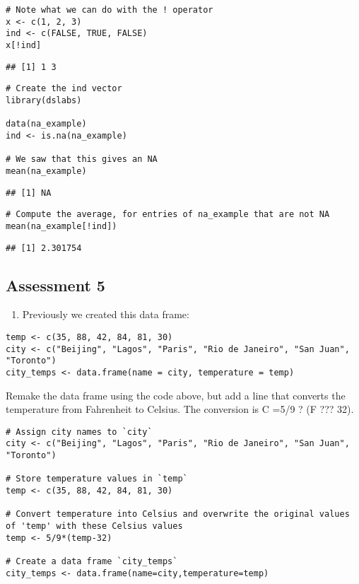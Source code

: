 \documentclass[
]{article}
\providecommand{\tightlist}{%
  \setlength{\itemsep}{0pt}\setlength{\parskip}{0pt}}
\begin{document}
\begin{verbatim}
# Note what we can do with the ! operator
x <- c(1, 2, 3)
ind <- c(FALSE, TRUE, FALSE)
x[!ind]
\end{verbatim}

\begin{verbatim}
## [1] 1 3
\end{verbatim}

\begin{verbatim}
# Create the ind vector
library(dslabs)

data(na_example)
ind <- is.na(na_example)

# We saw that this gives an NA
mean(na_example)
\end{verbatim}

\begin{verbatim}
## [1] NA
\end{verbatim}

\begin{verbatim}
# Compute the average, for entries of na_example that are not NA 
mean(na_example[!ind])
\end{verbatim}

\begin{verbatim}
## [1] 2.301754
\end{verbatim}

\hypertarget{assessment-5}{%
\subsection{Assessment 5}\label{assessment-5}}

\begin{enumerate}
\def\labelenumi{\arabic{enumi}.}
\tightlist
\item
  Previously we created this data frame:
\end{enumerate}

\begin{verbatim}
temp <- c(35, 88, 42, 84, 81, 30)
city <- c("Beijing", "Lagos", "Paris", "Rio de Janeiro", "San Juan", "Toronto")
city_temps <- data.frame(name = city, temperature = temp)
\end{verbatim}

Remake the data frame using the code above, but add a line that converts
the temperature from Fahrenheit to Celsius. The conversion is C =5/9 ?
(F ??? 32).

\begin{verbatim}
# Assign city names to `city` 
city <- c("Beijing", "Lagos", "Paris", "Rio de Janeiro", "San Juan", "Toronto")

# Store temperature values in `temp`
temp <- c(35, 88, 42, 84, 81, 30)

# Convert temperature into Celsius and overwrite the original values of 'temp' with these Celsius values
temp <- 5/9*(temp-32)

# Create a data frame `city_temps` 
city_temps <- data.frame(name=city,temperature=temp)
\end{verbatim}
\end{document}
